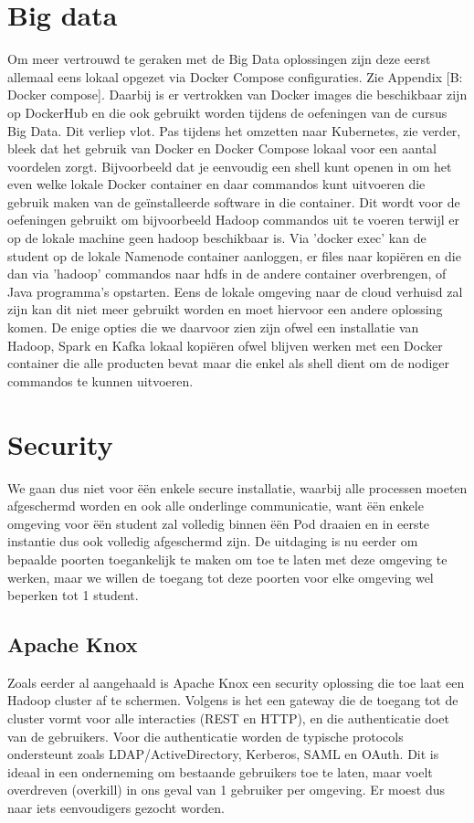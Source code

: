 \section{Big data}
Om meer vertrouwd te geraken met de Big Data oplossingen zijn deze eerst allemaal eens lokaal opgezet via Docker Compose configuraties. Zie Appendix [B: Docker compose].
Daarbij is er vertrokken van Docker images die beschikbaar zijn op DockerHub en die ook gebruikt worden tijdens de oefeningen van de cursus Big Data.
\newline
\newline
Dit verliep vlot. Pas tijdens het omzetten naar Kubernetes, zie verder, bleek dat het gebruik van Docker en Docker Compose lokaal voor een aantal voordelen zorgt. Bijvoorbeeld dat je eenvoudig een shell kunt openen in om het even welke lokale Docker container en daar commandos kunt uitvoeren die gebruik maken van de geïnstalleerde software in die container. Dit wordt voor de oefeningen gebruikt om bijvoorbeeld Hadoop commandos uit te voeren terwijl er op de lokale machine geen hadoop beschikbaar is. Via 'docker exec' kan de student op de lokale Namenode container aanloggen, er files naar kopiëren en die dan via 'hadoop' commandos naar hdfs in de andere container overbrengen, of Java programma's opstarten.
Eens de lokale omgeving naar de cloud verhuisd zal zijn kan dit niet meer gebruikt worden en moet hiervoor een andere oplossing komen. De enige opties die we daarvoor zien zijn ofwel een installatie van Hadoop, Spark en Kafka lokaal kopiëren ofwel blijven werken met een Docker container die alle producten bevat maar die enkel als shell dient om de nodiger commandos te kunnen uitvoeren.
\newline

\section{Security}
We gaan dus niet voor ëën enkele secure installatie, waarbij alle processen moeten afgeschermd worden en ook alle onderlinge communicatie, want ëën enkele omgeving voor ëën student zal volledig binnen ëën Pod draaien en in eerste instantie dus ook volledig afgeschermd zijn.
De uitdaging is nu eerder om bepaalde poorten toegankelijk te maken om toe te laten met deze omgeving te werken, maar we willen de toegang tot deze poorten voor elke omgeving wel beperken tot 1 student.

\subsection{Apache Knox}
Zoals eerder al aangehaald is Apache Knox een security oplossing die toe laat een Hadoop cluster af te schermen.
Volgens \textcite{Knox2023} is het een gateway die de toegang tot de cluster vormt voor alle interacties (REST en HTTP), en die authenticatie doet van de gebruikers. Voor die authenticatie worden de typische protocols ondersteunt zoals LDAP/ActiveDirectory, Kerberos, SAML en OAuth. Dit is ideaal in een onderneming om bestaande gebruikers toe te laten, maar voelt overdreven (overkill) in ons geval van 1 gebruiker per omgeving. Er moest dus naar iets eenvoudigers gezocht worden.


